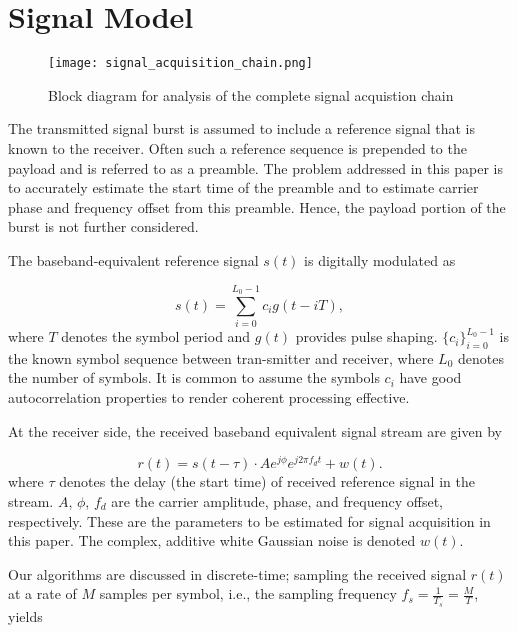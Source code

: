 \section{Signal Model}
\label{sec:model}

\begin{figure*}[t]
  \centerline{\texttt{[image: signal\_acquisition\_chain.png]}}
  \caption{Block diagram for analysis of the complete signal acquistion chain}
  \label{fig:sig_acquis_chain}
  \end{figure*}

The transmitted signal burst is assumed to include a refere\-nce signal that is known to the receiver.
Often such a reference sequence is prepended to the payload and is referred to as a preamble.
The problem addressed in this paper is to accurately estimate the start time of the preamble and 
to estimate carrier phase and frequency offset from this preamble.
Hence, the payload portion of the burst is not further considered.

The baseband-equivalent reference signal $s(t)$ is digitally modulated as

\begin{equation}
    \label{eq:l_ref_sig_analog}
    s(t) = \sum_{i=0}^{L_0-1} c_i g(t-iT),
  \end{equation}
where $T$ denotes the symbol period and $g(t)$ provides pulse shaping. $\{c_i\}_{i=0}^{L_{0}-1}$ is the known symbol sequence
between tran-smitter and receiver, where $L_0$ denotes the number of symbols. It is common to assume the symbols 
$c_i$ have good autocorrelation properties to render coherent processing effective.

At the receiver side, the received baseband equivalent signal stream are given by

\begin{equation}
    \label{eq:rec_sig_analog}
    r(t) = s(t-\tau) \cdot Ae^{j \phi} e^{j2\pi f_d t} + w(t).
  \end{equation}
where $\tau$ denotes the delay (the start time) of received reference signal in the stream. $A$, $\phi$, $f_d$ 
are the carrier amplitude, phase, and frequency offset, respectively. These are the parameters to be estimated
for signal acquisition in this paper. The complex, additive white Gaussian noise is denoted $w(t)$.

Our algorithms are discussed in discrete-time; sampling the received signal $r(t)$ at a rate of $M$ samples per symbol,
i.e., the sampling frequency $f_s=\frac{1}{T_s}=\frac{M}{T}$, yields 

